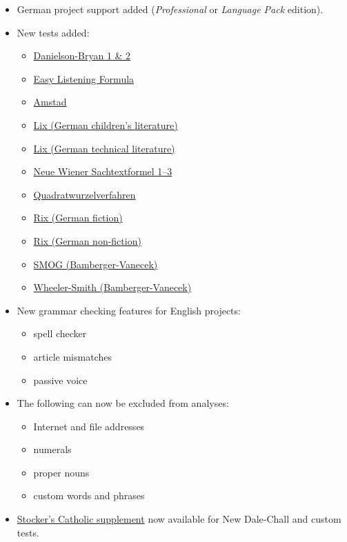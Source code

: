 \documentclass[
]{book}
\providecommand{\tightlist}{%
  \setlength{\itemsep}{0pt}\setlength{\parskip}{0pt}}
\theoremstyle{definition}
\theoremstyle{definition}
\theoremstyle{definition}
\theoremstyle{definition}
\theoremstyle{remark}
\begin{document}
\begin{itemize}
\tightlist
\item
  German project support added (\emph{Professional} or \emph{Language Pack} edition).
\item
  New tests added:

  \begin{itemize}
  \tightlist
  \item
    \protect\hyperlink{danielson-bryan-1}{Danielson-Bryan 1 \& 2}
  \item
    \protect\hyperlink{easy-listening-formula}{Easy Listening Formula}
  \item
    \protect\hyperlink{amstad}{Amstad}
  \item
    \protect\hyperlink{lix-german-childrens-literature}{Lix (German children's literature)}
  \item
    \protect\hyperlink{lix-german-technical}{Lix (German technical literature)}
  \item
    \protect\hyperlink{neue-wiener-sachtextformel1}{Neue Wiener Sachtextformel 1--3}
  \item
    \protect\hyperlink{qu-bamberger-vanecek}{Quadratwurzelverfahren}
  \item
    \protect\hyperlink{rix-german-fiction}{Rix (German fiction)}
  \item
    \protect\hyperlink{rix-german-nonfiction}{Rix (German non-fiction)}
  \item
    \protect\hyperlink{smog-bamberger-vanecek}{SMOG (Bamberger-Vanecek)}
  \item
    \protect\hyperlink{wheeler-smith-bamberger-vanecek}{Wheeler-Smith (Bamberger-Vanecek)}
  \end{itemize}
\item
  New grammar checking features for English projects:

  \begin{itemize}
  \tightlist
  \item
    spell checker
  \item
    article mismatches
  \item
    passive voice
  \end{itemize}
\item
  The following can now be excluded from analyses:

  \begin{itemize}
  \tightlist
  \item
    Internet and file addresses
  \item
    numerals
  \item
    proper nouns
  \item
    custom words and phrases
  \end{itemize}
\item
  \protect\hyperlink{stocker-catholic-supplement}{Stocker's Catholic supplement} now available for New Dale-Chall and custom tests.
\end{itemize}
\end{document}
